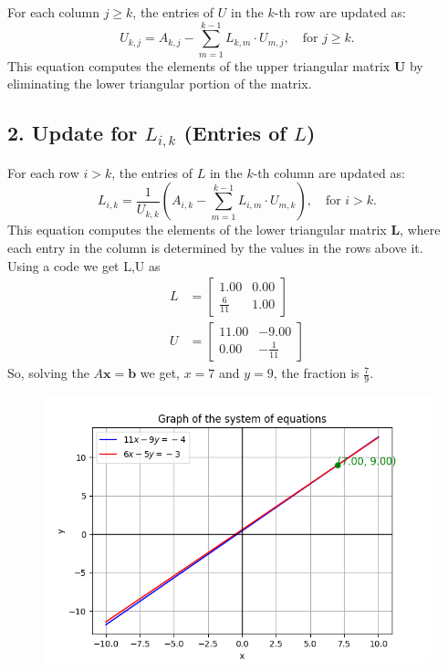 \documentclass[journal]{IEEEtran}
\begin{document}
For each column $ j \geq k $, the entries of $ U $ in the $ k $-th row are updated as:
\[
U_{k,j} = A_{k,j} - \sum_{m=1}^{k-1} L_{k,m} \cdot U_{m,j}, \quad \text{for } j \geq k.
\]
This equation computes the elements of the upper triangular matrix $ \mathbf{U} $ by eliminating the lower triangular portion of the matrix.

\subsection*{2. Update for $ L_{i,k} $ (Entries of $ L $)}

For each row $ i > k $, the entries of $ L $ in the $ k $-th column are updated as:
\[
L_{i,k} = \frac{1}{U_{k,k}} \left( A_{i,k} - \sum_{m=1}^{k-1} L_{i,m} \cdot U_{m,k} \right), \quad \text{for } i > k.
\]
This equation computes the elements of the lower triangular matrix $ \mathbf{L} $, where each entry in the column is determined by the values in the rows above it.\\
Using a code we get L,U as 
\begin{align}
	L&=\begin{bmatrix} 1.00 & 0.00 \\ \frac{6}{11} & 1.00 \end{bmatrix}         \\
		U&=\begin{bmatrix} 11.00 & -9.00 \\ 0.00 & -\frac{1}{11} \end{bmatrix}
\end{align}
So, solving the $A\textbf{x}= \textbf{b}$ we get, $x=7$ and $y=9$, the fraction is $\frac{7}{9}$.

\begin{figure}[h!]
    \centering
    \includegraphics[width=0.7\columnwidth]{fig/Figure_1.png}
    \label{label}
\end{figure}	
\end{document}
